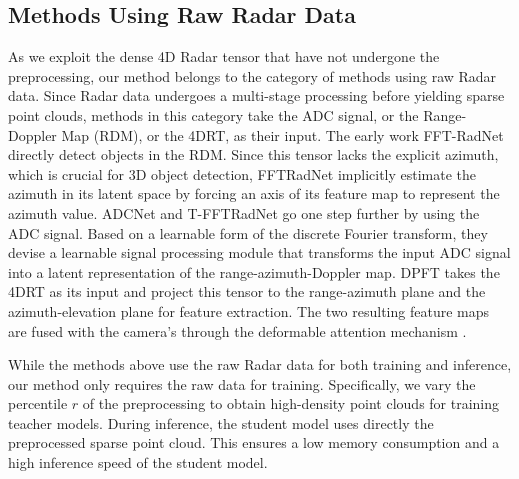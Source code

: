 \subsection{Methods Using Raw Radar Data}
As we exploit the dense 4D Radar tensor that have not undergone the preprocessing, our method belongs to the category of methods using raw Radar data.
Since Radar data undergoes a multi-stage processing before yielding sparse point clouds, methods in this category take the ADC signal, or the Range-Doppler Map (RDM), or the 4DRT, as their input.
The early work FFT-RadNet \cite{fftradnet} directly detect objects in the RDM.
Since this tensor lacks the explicit azimuth, which is crucial for 3D object detection, FFTRadNet implicitly estimate the azimuth in its latent space by forcing an axis of its feature map to represent the azimuth value.
ADCNet \cite{adcnet} and T-FFTRadNet \cite{t-fftradnet} go one step further by using the ADC signal.
Based on a learnable form of the discrete Fourier transform, they devise a learnable signal processing module that transforms the input ADC signal into a latent representation of the range-azimuth-Doppler map.
DPFT \cite{fent2024dpft} takes the 4DRT as its input and project this tensor to the range-azimuth plane and the azimuth-elevation plane for feature extraction.
The two resulting feature maps are fused with the camera's through the deformable attention mechanism \cite{zhu2021deformable}.

While the methods above use the raw Radar data for both training and inference, our method only requires the raw data for training.
Specifically, we vary the percentile $r$ of the preprocessing to obtain high-density point clouds for training teacher models.
During inference, the student model uses directly the preprocessed sparse point cloud.
This ensures a low memory consumption and a high inference speed of the student model.

